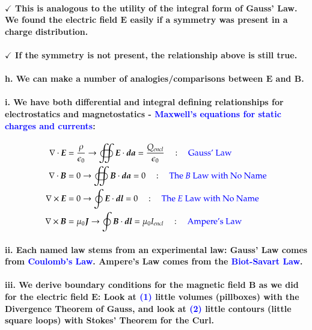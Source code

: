\documentclass{article}
\begin{document}
\paragraph{\indent\indent $\checkmark$ This is analogous to the utility of the integral form of Gauss' Law. We found the electric field $\boldsymbol{E}$ easily if a symmetry was present in a charge distribution.}
\paragraph{\indent\indent $\checkmark$ If the symmetry is not present, the relationship above is still true.}
\paragraph{\indent h. We can make a number of analogies/comparisons between $\boldsymbol{E}$ and $\boldsymbol{B}$.}
\paragraph{\indent\indent i. We have both differential and integral defining relationships for electrostatics and magnetostatics - \textcolor{blue}{Maxwell's equations for static charges and currents}:}
\begin{align*}
    \nabla\cdot\boldsymbol{E}&=\frac{\rho}{\epsilon_0}\rightarrow \oiint \boldsymbol{E}\cdot\boldsymbol{da}=\frac{Q_{encl}}{\epsilon_0}\quad:\quad \text{\textcolor{blue}{Gauss' Law}}\\
    \nabla\cdot\boldsymbol{B}&=0\rightarrow \oiint\boldsymbol{B}\cdot\boldsymbol{da}=0\quad:\quad \text{\textcolor{blue}{The $B$ Law with No Name}}\\
    \nabla\times\boldsymbol{E}&=0\rightarrow \oint\boldsymbol{E}\cdot\boldsymbol{dl}=0\quad:\quad \text{\textcolor{blue}{The $E$ Law with No Name}}\\
    \nabla\times\boldsymbol{B}&=\mu_0\boldsymbol{J}\rightarrow\oint\boldsymbol{B}\cdot\boldsymbol{dl}=\mu_0I_{encl}\quad:\quad \text{\textcolor{blue}{Ampere's Law}}\\
\end{align*}
\paragraph{\indent\indent ii. Each named law stems from an experimental law: Gauss' Law comes from \textcolor{blue}{Coulomb's Law}. Ampere's Law comes from the \textcolor{blue}{Biot-Savart Law}.}
\paragraph{\indent\indent iii. We derive boundary conditions for the magnetic field $\boldsymbol{B}$ as we did for the electric field $\boldsymbol{E}$: Look at \textcolor{blue}{(1)} little volumes (pillboxes) with the Divergence Theorem of Gauss, and look at \textcolor{blue}{(2)} little contours (little square loops) with Stokes' Theorem for the Curl.}
\end{document}

